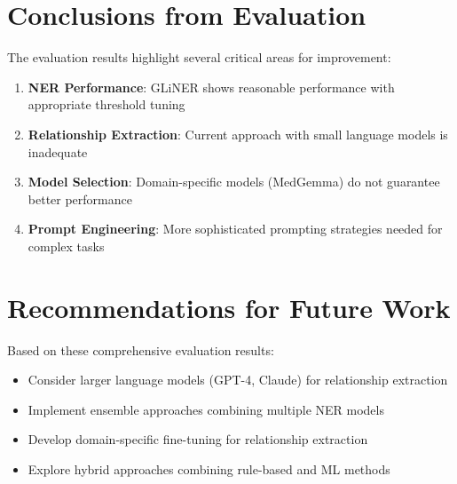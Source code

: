 \section{Conclusions from Evaluation}

The evaluation results highlight several critical areas for improvement:

\begin{enumerate}
    \item \textbf{NER Performance}: GLiNER shows reasonable performance with appropriate threshold tuning
    \item \textbf{Relationship Extraction}: Current approach with small language models is inadequate
    \item \textbf{Model Selection}: Domain-specific models (MedGemma) do not guarantee better performance
    \item \textbf{Prompt Engineering}: More sophisticated prompting strategies needed for complex tasks
\end{enumerate}

\section{Recommendations for Future Work}

Based on these comprehensive evaluation results:
\begin{itemize}
    \item Consider larger language models (GPT-4, Claude) for relationship extraction
    \item Implement ensemble approaches combining multiple NER models
    \item Develop domain-specific fine-tuning for relationship extraction
    \item Explore hybrid approaches combining rule-based and ML methods
\end{itemize}